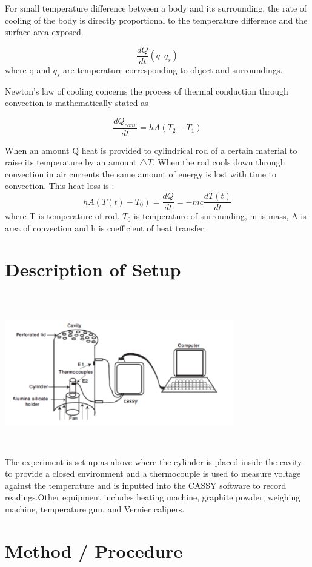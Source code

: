 For small temperature difference between a body and its surrounding, the rate of cooling of the body is directly proportional to the temperature difference and the surface area exposed. 

$$\frac{dQ}{dt}  (q – q_s)$$ where q and $q_s$ are temperature corresponding to object and surroundings.

Newton’s law of cooling concerns the process of thermal conduction through convection is mathematically stated as

$$\frac{dQ_{conv}}{dt} = hA(T_2-T_1)$$

When an amount Q heat is provided to cylindrical rod of a certain material to raise its temperature by an amount $\triangle T$. When the rod cools down through convection in air currents the same amount of energy is lost with time to convection. This heat loss is : 
 $$hA(T(t)-T_0) = \frac{dQ}{dt}=-mc \frac{dT(t)}{dt}$$ where T is temperature of rod. $T_0$ is temperature of surrounding, m is mass, A is area of convection and h is coefficient of heat transfer.  


\section{Description of Setup}
\includegraphics[width=10cm, height=7cm]{figures/fig10.png} \\

The experiment is set up as above where the cylinder is placed inside the cavity to provide a closed environment and a thermocouple is used to measure voltage against the temperature and is inputted into the CASSY software to record readings.Other equipment includes heating machine, graphite powder, weighing machine, temperature gun, and Vernier calipers. 

\section{Method / Procedure}

